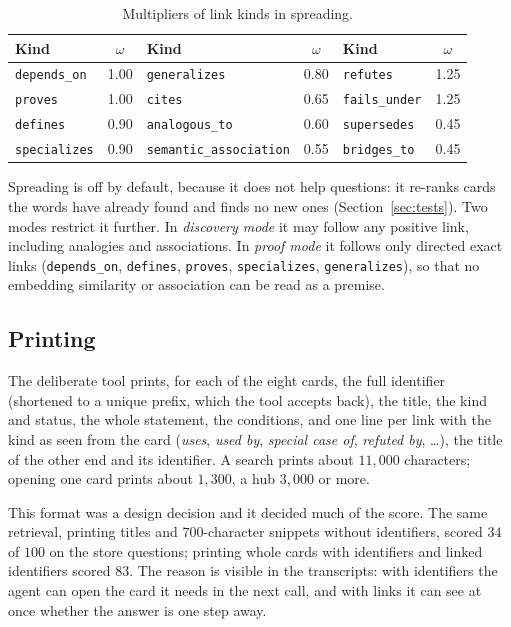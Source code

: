 \begin{table}[ht]
\centering\small
\begin{tabular}{lc@{\qquad}lc@{\qquad}lc}
\toprule
Kind & $\omega$ & Kind & $\omega$ & Kind & $\omega$\\
\midrule
\texttt{depends\_on} & 1.00 & \texttt{generalizes} & 0.80 & \texttt{refutes} & 1.25\\
\texttt{proves} & 1.00 & \texttt{cites} & 0.65 & \texttt{fails\_under} & 1.25\\
\texttt{defines} & 0.90 & \texttt{analogous\_to} & 0.60 & \texttt{supersedes} & 0.45\\
\texttt{specializes} & 0.90 & \texttt{semantic\_association} & 0.55 & \texttt{bridges\_to} & 0.45\\
\bottomrule
\end{tabular}
\caption{Multipliers of link kinds in spreading.}
\label{tab:omega}
\end{table}

Spreading is off by default, because it does not help questions: it re-ranks cards the words have already found and finds no new ones (Section~\ref{sec:tests}). Two modes restrict it further. In \emph{discovery mode} it may follow any positive link, including analogies and associations. In \emph{proof mode} it follows only directed exact links (\texttt{depends\_on}, \texttt{defines}, \texttt{proves}, \texttt{specializes}, \texttt{generalizes}), so that no embedding similarity or association can be read as a premise.

\subsection{Printing}
The deliberate tool prints, for each of the eight cards, the full identifier (shortened to a unique prefix, which the tool accepts back), the title, the kind and status, the whole statement, the conditions, and one line per link with the kind as seen from the card (\emph{uses}, \emph{used by}, \emph{special case of}, \emph{refuted by}, \dots), the title of the other end and its identifier. A search prints about $11{,}000$ characters; opening one card prints about $1{,}300$, a hub $3{,}000$ or more.

This format was a design decision and it decided much of the score. The same retrieval, printing titles and $700$-character snippets without identifiers, scored $34$ of $100$ on the store questions; printing whole cards with identifiers and linked identifiers scored $83$. The reason is visible in the transcripts: with identifiers the agent can open the card it needs in the next call, and with links it can see at once whether the answer is one step away.

